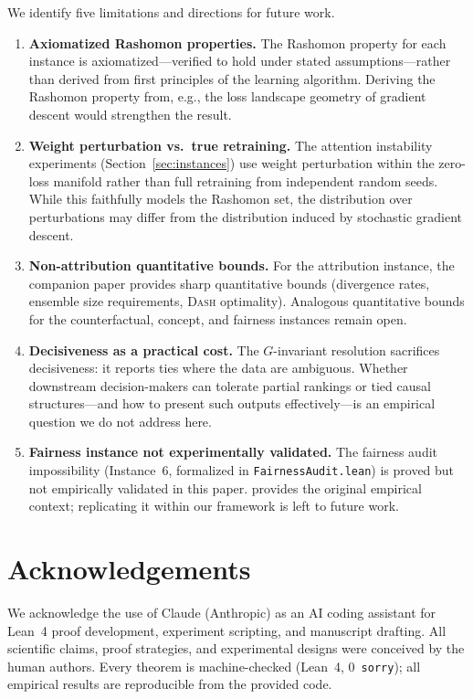\documentclass[twoside]{jmlr}
\newcommand{\DASH}{\textsc{Dash}}
\begin{document}
We identify five limitations and directions for future work.
\begin{enumerate}
  \item \textbf{Axiomatized Rashomon properties.}  The Rashomon property for
    each instance is axiomatized---verified to hold under stated
    assumptions---rather than derived from first principles of the learning
    algorithm.  Deriving the Rashomon property from, e.g., the loss landscape
    geometry of gradient descent would strengthen the result.
  \item \textbf{Weight perturbation vs.\ true retraining.}  The attention
    instability experiments (Section~\ref{sec:instances}) use weight
    perturbation within the zero-loss manifold rather than full retraining from
    independent random seeds.  While this faithfully models the Rashomon set,
    the distribution over perturbations may differ from the distribution induced
    by stochastic gradient descent.
  \item \textbf{Non-attribution quantitative bounds.}  For the attribution
    instance, the companion paper provides sharp quantitative bounds (divergence
    rates, ensemble size requirements, \DASH{} optimality).  Analogous
    quantitative bounds for the counterfactual, concept, and fairness instances
    remain open.
  \item \textbf{Decisiveness as a practical cost.}  The $G$-invariant
    resolution sacrifices decisiveness: it reports ties where the data are
    ambiguous.  Whether downstream decision-makers can tolerate partial rankings
    or tied causal structures---and how to present such outputs
    effectively---is an empirical question we do not address here.
  \item \textbf{Fairness instance not experimentally validated.}  The fairness
    audit impossibility (Instance~6, formalized in \texttt{FairnessAudit.lean})
    is proved but not empirically validated in this paper.
    \citet{chouldechova2017fair} provides the original empirical context;
    replicating it within our framework is left to future work.
\end{enumerate}


\section*{Acknowledgements}

We acknowledge the use of Claude (Anthropic) as an AI coding assistant
for Lean~4 proof development, experiment scripting, and manuscript
drafting.  All scientific claims, proof strategies, and experimental
designs were conceived by the human authors.  Every theorem is
machine-checked (Lean~4, 0~\texttt{sorry}); all empirical results are
reproducible from the provided code.


\end{document}
